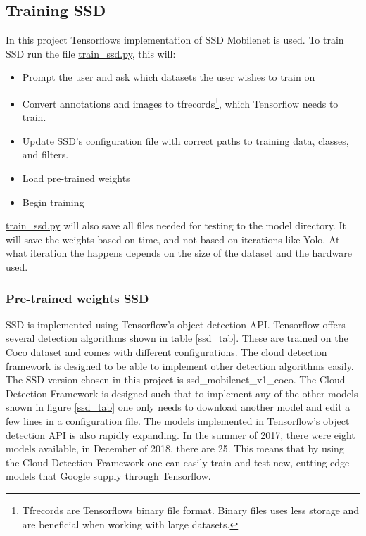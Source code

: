 \newpage

\subsection{Training SSD}
In this project Tensorflows implementation of SSD Mobilenet is used. To train SSD run the file \url{train_ssd.py}, this will:

\begin{itemize}
    \item Prompt the user and ask which datasets the user wishes to train on
    \item Convert annotations and images to tfrecords\footnote{Tfrecords are Tensorflows binary file format. Binary files uses less storage and are beneficial when working with large datasets.}, which Tensorflow needs to train.
    \item Update SSD's configuration file with correct paths to training data, classes, and filters.
    \item Load pre-trained weights
    \item Begin training
\end{itemize}

\url{train_ssd.py} will also save all files needed for testing to the model directory. It will save the weights based on time, and not based on iterations like Yolo. At what iteration the happens depends on the size of the dataset and the hardware used. 

\subsubsection{Pre-trained weights SSD}
SSD is implemented using Tensorflow's object detection API. Tensorflow offers several detection algorithms shown in table \ref{ssd_tab}. These are trained on the Coco dataset and comes with different configurations. The cloud detection framework is designed to be able to implement other detection algorithms easily. The SSD version chosen in this project is ssd\_mobilenet\_v1\_coco. The Cloud Detection Framework is designed such that to implement any of the other models shown in figure \ref{ssd_tab} one only needs to download another model and edit a few lines in a configuration file. The models implemented in Tensorflow's object detection API is also rapidly expanding. In the summer of 2017, there were eight models available, in December of 2018, there are 25. This means that by using the Cloud Detection Framework one can easily train and test new, cutting-edge models that Google supply through Tensorflow.

